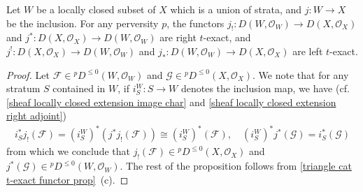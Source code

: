 \begin{proposition}\label{stratified space perverse t-structure locally closed inclusion t-exact}
Let $W$ be a locally closed subset of $X$ which is a union of strata, and $j:W\to X$ be the inclusion. For any perversity $p$, the functors $j_!:D(W,\mathscr{O}_W)\to D(X,\mathscr{O}_X)$ and $j^*:D(X,\mathscr{O}_X)\to D(W,\mathscr{O}_W)$ are right $t$-exact, and $j^!:D(X,\mathscr{O}_X)\to D(W,\mathscr{O}_W)$ and $j_*:D(W,\mathscr{O}_W)\to D(X,\mathscr{O}_X)$ are left $t$-exact.
\end{proposition}
\begin{proof}
Let $\mathscr{F}\in {^p\!D^{\leq 0}}(W,\mathscr{O}_W)$ and $\mathscr{G}\in {^p\!D^{\leq 0}}(X,\mathscr{O}_X)$. We note that for any stratum $S$ contained in $W$, if $i_S^W:S\to W$ denotes the inclusion map, we have (cf. \cref{sheaf locally closed extension image char} and \cref{sheaf locally closed extension right adjoint})
\begin{align*}
i_S^*j_!(\mathscr{F})=(i_S^W)^*(j^*j_!(\mathscr{F}))\cong (i_S^W)^*(\mathscr{F}),\quad (i_S^W)^*j^*(\mathscr{G})=i_S^*(\mathscr{G})
\end{align*}
from which we conclude that $j_!(\mathscr{F})\in {^p\!D^{\leq 0}}(X,\mathscr{O}_X)$ and $j^*(\mathscr{G})\in {^p\!D^{\leq 0}}(W,\mathscr{O}_W)$. The rest of the proposition follows from \cref{triangle cat t-exact functor prop}~(c).
\end{proof}

